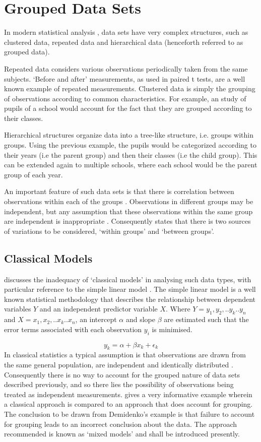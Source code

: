 \documentclass[12pt, a4paper]{report}
\begin{document}
\section{Grouped Data Sets}
In modern statistical analysis , data sets have very complex
structures, such as  clustered data, repeated data and
hierarchical data (henceforth referred to as grouped data).

Repeated data considers various observations periodically taken
from the same subjects. `Before and after' measurements, as used
in paired t tests, are a well known example of repeated
measurements. Clustered data is simply the grouping of
observations according to common characteristics. For example, an
study of pupils of a school would account for the fact that they
are grouped according to their classes.

Hierarchical structures organize data into a tree-like structure,
i.e. groups within groups. Using the previous example, the pupils
would be categorized according to their years (i.e the parent
group) and then their classes (i.e the child group). This can be
extended again to multiple schools, where each school would be the
parent group of each year.

An important feature of such data sets is that there is
correlation between observations within each of the groups
\citep{Faraway}. Observations in different groups may be
independent, but any assumption that these observations within the
same group are independent is inappropriate . Consequently
\citet{Demi} states that there is two sources of variations to be
considered, `within groups' and `between groups'.


\subsection{Classical Models}
\citet{Demi} discusses the inadequacy of `classical models' in
analysing such data types, with particular reference to the simple
linear model . The simple linear model is a well known statistical
methodology that describes the relationship between dependent
variables $Y$ and an independent predictor variable $X$. Where
$Y={y_{1},y_{2},..y_{k}..y_{n}}$ and
$X={x_{1},x_{2},..x_{k}..x_{n}}$, an intercept $\alpha$ and slope
$\beta$ are estimated such that the error terms associated with
each observation $y_{i}$ is minimised.

\begin{equation}
y_{k} = \alpha + \beta x_{k}+ \epsilon_{k}
\end{equation}
In classical statistics a typical assumption is that observations
are drawn from the same general population, are independent and
identically distributed \citep{Demi}. Consequently there is no way
to account for the grouped nature of data sets described
previously, and so there lies the possibility of observations
being treated as independent measurements. \citet[pg.3]{Demi}
gives a very informative example wherein a classical approach is
compared to an approach that does account for grouping. The
conclusion to be drawn from Demidenko's example is that failure to
account for grouping leads to an incorrect conclusion about the
data. The approach recommended is known as `mixed models' and
shall be introduced presently.
\end{document}

